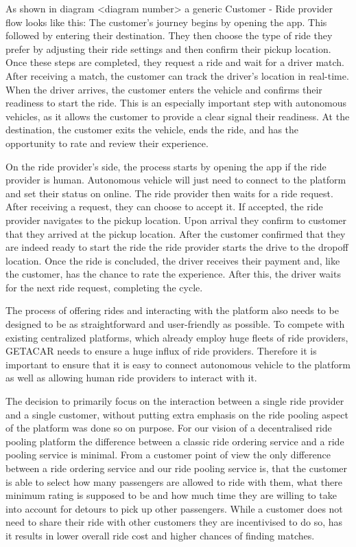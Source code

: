 As shown in diagram <diagram number> a generic Customer - Ride provider flow looks like this:
The customer's journey begins by opening the app. This followed by entering their destination. They then choose the type of ride they prefer by adjusting their ride settings and then confirm their pickup location. Once these steps are completed, they request a ride and wait for a driver match. After receiving a match, the customer can track the driver's location in real-time. When the driver arrives, the customer enters the vehicle and confirms their readiness to start the ride. This is an especially important step with autonomous vehicles, as it allows the customer to provide a clear signal their readiness. At the destination, the customer exits the vehicle, ends the ride, and has the opportunity to rate and review their experience.

On the ride provider's side, the process starts by opening the app if the ride provider is human. Autonomous vehicle will just need to connect to the platform and set their status on online. The ride provider then waits for a ride request. After receiving a request, they can choose to accept it. If accepted, the ride provider navigates to the pickup location. Upon arrival they confirm to  customer that they arrived at the pickup location. After the customer confirmed that they are indeed ready to start the ride the ride provider starts the drive to the dropoff location. Once the ride is concluded, the driver receives their payment and, like the customer, has the chance to rate the experience. After this, the driver waits for the next ride request, completing the cycle.

The process of offering rides and interacting with the platform also needs to be designed to be as straightforward and user-friendly as possible. To compete with existing centralized platforms, which already employ huge fleets of ride providers, GETACAR needs to ensure a huge influx of ride providers. Therefore it is important to ensure that it is easy to connect autonomous vehicle to the platform as well as allowing human ride providers to interact with it. 

The decision to primarily focus on the interaction between a single ride provider and a single customer, without putting extra emphasis on the ride pooling aspect of the platform was done so on purpose. For our vision of a decentralised ride pooling platform the difference between a classic ride ordering service and a ride pooling service is minimal. From a customer point of view the only difference between a ride ordering service and our ride pooling service is, that the customer is able to select how many passengers are allowed to ride with them, what there minimum rating is supposed to be and how much time they are willing to take into account for detours to pick up other passengers. While a customer does not need to share their ride with other customers they are incentivised to do so, has it results in lower overall ride cost and higher chances of finding matches. 

